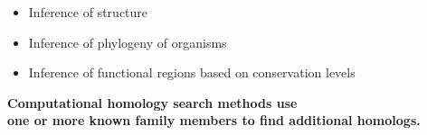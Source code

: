 \documentclass[landscape]{slides}
\begin{document}
\begin{slide}
\begin{slide}
\vfill
\end{slide}
\begin{slide}
\end{slide}
\begin{slide}


\begin{itemize}
\item Inference of  structure
\item Inference of phylogeny of organisms
\item Inference of functional regions based on conservation levels
\end{itemize}

\medskip
\medskip
\normalsize
\begin{center}
\textbf{Computational homology search methods use \\ one or more known
family members to find additional homologs.}
\end{center}


\end{slide}
\end{slide}
\end{document}
